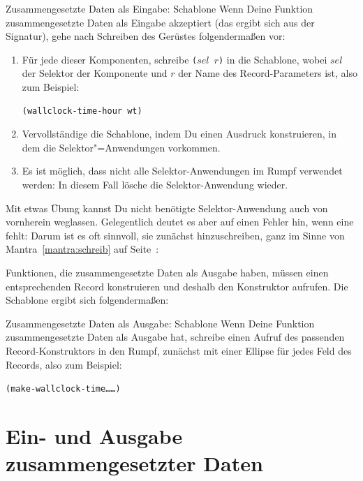 \begin{konstruktionsanleitung}{Zusammengesetzte Daten als Eingabe:
    Schablone}
  \label{ka:zusammengesetzt-eingabe-schablone}
  Wenn Deine Funktion zusammengesetzte Daten als Eingabe akzeptiert
  (das ergibt sich aus der Signatur), gehe nach Schreiben des Gerüstes
  folgendermaßen vor:
%
\begin{enumerate}
\item Für jede dieser Komponenten, schreibe  \texttt{($\mathit{sel}$ $r$)} in die
  Schablone, wobei $\mathit{sel}$ der Selektor der Komponente und $r$ der Name
  des Record-Parameters ist, also zum Beispiel:
\begin{verbatim}
(wallclock-time-hour wt)
\end{verbatim}
\item Vervollständige die Schablone, indem Du einen Ausdruck
  konstruieren, in dem die Selektor"=Anwendungen vorkommen.
\item Es ist möglich, dass nicht alle Selektor-Anwendungen im Rumpf
  verwendet werden: In diesem Fall lösche die Selektor-Anwendung
  wieder.
\end{enumerate}
%
\end{konstruktionsanleitung}
%
Mit etwas Übung kannst Du nicht benötigte Selektor-Anwendung auch von
vornherein weglassen.  Gelegentlich deutet es aber auf einen Fehler
hin, wenn eine fehlt: Darum ist es oft sinnvoll, sie zunächst
hinzuschreiben, ganz im Sinne von Mantra~\ref{mantra:schreib} auf
Seite~\pageref{mantra:schreib}:

\mantraschreib*

Funktionen, die zusammengesetzte Daten als Ausgabe haben, müssen einen
entsprechenden Record konstruieren und deshalb den Konstruktor
aufrufen.  Die Schablone ergibt sich folgendermaßen:
%
\begin{konstruktionsanleitung}{Zusammengesetzte Daten als Ausgabe:
    Schablone}
    \label{ka:zusammengesetzt-ausgabe-schablone}
  Wenn Deine Funktion zusammengesetzte Daten als Ausgabe hat, schreibe
  einen Aufruf des passenden Record-Konstruktors in den Rumpf,
  zunächst mit einer Ellipse für jedes Feld des Records, also zum
  Beispiel:
\begin{alltt}
(make-wallclock-time \ldots{} \ldots)
\end{alltt}

\end{konstruktionsanleitung}

\section{Ein- und Ausgabe zusammengesetzter Daten}
\label{sec:armadillo}

